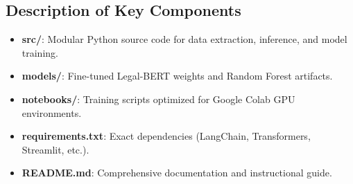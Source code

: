 \documentclass[conference]{IEEEtran}
\begin{document}
\subsection{Description of Key Components}

\begin{itemize}
    \item \textbf{src/}: Modular Python source code for data extraction, inference, and model training.
    \item \textbf{models/}: Fine-tuned Legal-BERT weights and Random Forest artifacts.
    \item \textbf{notebooks/}: Training scripts optimized for Google Colab GPU environments.
    \item \textbf{requirements.txt}: Exact dependencies (LangChain, Transformers, Streamlit, etc.).
    \item \textbf{README.md}: Comprehensive documentation and instructional guide.
\end{itemize}
\end{document}
